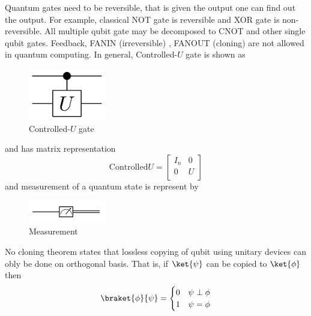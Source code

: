 Quantum gates need to be reversible, that is given the output one can find out the output. For example, classical NOT gate is reversible and XOR gate is non-reversible. All multiple qubit gate may be decomposed to CNOT and other single qubit gates. Feedback, FANIN (irreversible) , FANOUT (cloning) are not allowed in quantum computing. In general, Controlled-\(U\) gate is shown as
\begin{figure}
    \centering
    \includegraphics[width = 0.3\textwidth]{Chapters/Graphics/Controlled_Gate.png}
    \caption{Controlled-\(U\) gate}
\end{figure}
and has matrix representation
\begin{equation*}
    \text{Controlled} U = \begin{bmatrix}
        I_n & 0 \\
        0 & U \\
    \end{bmatrix}
\end{equation*}
and measurement of a quantum state is represent by 
\begin{figure}
    \centering
    \includegraphics[width = 0.3\textwidth]{Chapters/Graphics/Measurement.png}
    \caption{Measurement}
\end{figure}

No cloning theorem states that lossless copying of qubit using unitary devices can obly be done on orthogonal basis. That is, if \(\ket{\psi}\) can be copied to \(\ket{\phi}\) then 
\begin{equation*}
    \braket{\phi}{\psi} = \begin{cases}
        0 & \psi \perp \phi\\
        1 & \psi = \phi
    \end{cases}
\end{equation*}


